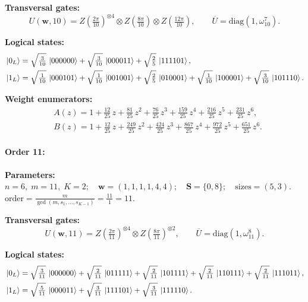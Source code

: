\documentclass[pdflatex,sn-nature]{sn-jnl}%
\theoremstyle{thmstyleone}%
\theoremstyle{thmstyletwo}%
\theoremstyle{thmstylethree}%
\begin{document}
\begin{appendices}
\noindent\textbf{Transversal gates:}
\[
    U(\mathbf w,10)=Z \left(\tfrac{2\pi}{10}\right)^{\otimes4} \otimes Z \left(\tfrac{8\pi}{10}\right) \otimes Z \left(\tfrac{12\pi}{10}\right),\qquad
    \overline U=\mathrm{diag}(1,\omega_{10}^{7}).
\]

\noindent\textbf{Logical states:}
\begin{align*}
    &\ket{0_L} = \sqrt{\tfrac{3}{10}}\,\ket{000000} + \sqrt{\tfrac{3}{10}}\,\ket{000011} + \sqrt{\tfrac{2}{5}}\,\ket{111101}, \\
    &\ket{1_L} = \sqrt{\tfrac{1}{10}}\,\ket{000101} + \sqrt{\tfrac{1}{10}}\,\ket{001001} + \sqrt{\tfrac{2}{5}}\,\ket{010001} + \sqrt{\tfrac{1}{10}}\,\ket{100001} + \sqrt{\tfrac{3}{10}}\,\ket{101110}.
\end{align*}

\noindent\textbf{Weight enumerators:}
\begin{align*}
    &A(z) = 1 + \tfrac{12}{25}\,z + \tfrac{81}{25}\,z^{2} + \tfrac{76}{25}\,z^{3} + \tfrac{159}{25}\,z^{4} + \tfrac{216}{25}\,z^{5} + \tfrac{231}{25}\,z^{6}, \\
    &B(z) = 1 + \tfrac{12}{25}\,z + \tfrac{249}{25}\,z^{2} + \tfrac{424}{25}\,z^{3} + \tfrac{867}{25}\,z^{4} + \tfrac{972}{25}\,z^{5} + \tfrac{651}{25}\,z^{6}.
\end{align*}

\paragraph{\textbf{Order 11:}}
\noindent\textbf{Parameters:} $n=6,\; m=11,\; K=2;\quad \mathbf w=(1, 1, 1, 1, 4, 4);\quad \mathbf S=\{0, 8\};\quad \text{sizes}=\left(5, 3\right).$ $\displaystyle \text{order}=\frac{m}{\gcd(m,s_1,\dots,s_{K-1})}=\frac{11}{1}=11.$

\noindent\textbf{Transversal gates:}
\[
    U(\mathbf w,11)=Z \left(\tfrac{2\pi}{11}\right)^{\otimes4} \otimes Z \left(\tfrac{8\pi}{11}\right)^{\otimes2},\qquad
    \overline U=\mathrm{diag}(1,\omega_{11}^{8}).
\]

\noindent\textbf{Logical states:}
\begin{align*}
    &\ket{0_L} = \sqrt{\tfrac{3}{11}}\,\ket{000000} + \sqrt{\tfrac{2}{11}}\,\ket{011111} + \sqrt{\tfrac{2}{11}}\,\ket{101111} + \sqrt{\tfrac{2}{11}}\,\ket{110111} + \sqrt{\tfrac{2}{11}}\,\ket{111011}, \\
    &\ket{1_L} = \sqrt{\tfrac{5}{11}}\,\ket{000011} + \sqrt{\tfrac{3}{11}}\,\ket{111101} + \sqrt{\tfrac{3}{11}}\,\ket{111110}.
\end{align*}


\end{appendices}
\end{document}
